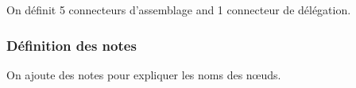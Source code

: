 \documentclass[a4paper,11pt]{report}
\newcommand{\inputTikZ}[1]{%
  }%
\newcommand{\inputTikZ}[1]{%
    \texttt{[image: fig/\#1.pdf]}%
  }%
\begin{document}
On définit 5 connecteurs d'assemblage and 1 connecteur de délégation.

\medskip

\vspace{-0.4cm}
{\color{red!70!black}}

\begin{center}
\inputTikZ{compdiagexstep3}
\end{center}

\subsubsection{Définition des notes}

On ajoute des notes pour expliquer les noms des n\oe{}uds.

\medskip

\vspace{-0.4cm}
{\color{red!70!black}}

\begin{center}
\inputTikZ{compdiagexstep4}
\end{center}

\end{document}
